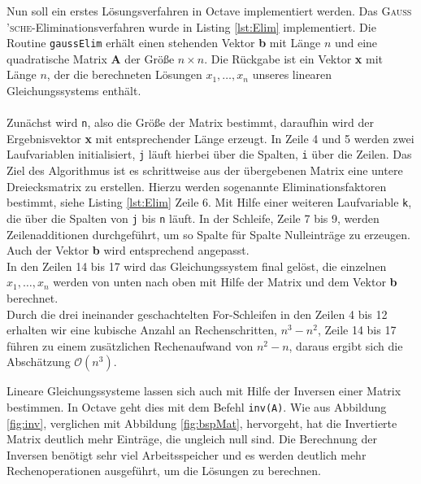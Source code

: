 Nun soll ein erstes Lösungsverfahren in Octave implementiert werden. Das \textsc{Gauss
'sche}-Eliminationsverfahren wurde in Listing \ref{lst:Elim} implementiert. Die Routine \texttt{gaussElim} erhält einen stehenden Vektor \textbf{b} mit Länge $n$ und eine quadratische Matrix \textbf{A} der Größe $n \times n$. Die Rückgabe ist ein Vektor \textbf{x} mit Länge $n$, der die berechneten Lösungen $x_{1}, \dots, x_{n}$ unseres linearen Gleichungssystems enthält.\\ \\
Zunächst wird \texttt{n}, also die Größe der Matrix bestimmt, daraufhin wird der Ergebnisvektor \textbf{x} mit entsprechender Länge erzeugt. In Zeile 4 und 5 werden zwei Laufvariablen initialisiert, \texttt{j} läuft hierbei über die Spalten, \texttt{i} über die Zeilen. Das Ziel des Algorithmus ist es schrittweise aus der übergebenen Matrix eine untere Dreiecksmatrix zu erstellen. Hierzu werden sogenannte Eliminationsfaktoren bestimmt, siehe Listing \ref{lst:Elim} Zeile 6. Mit Hilfe einer weiteren Laufvariable \texttt{k}, die über die Spalten von \texttt{j} bis \texttt{n} läuft. In der Schleife, Zeile 7 bis 9, werden Zeilenadditionen durchgeführt, um so Spalte für Spalte Nulleinträge zu erzeugen. Auch der Vektor \textbf{b} wird entsprechend angepasst. \\
In den Zeilen 14 bis 17 wird das Gleichungssystem final gelöst, die einzelnen $x_{1}, \dots, x_{n}$ werden von unten nach oben mit Hilfe der Matrix und dem Vektor \textbf{b} berechnet.  \\
Durch die drei ineinander geschachtelten For-Schleifen in den Zeilen 4 bis 12 erhalten wir eine kubische Anzahl an Rechenschritten, $n^{3}-n^{2}$, Zeile 14 bis 17 führen zu einem zusätzlichen Rechenaufwand von $n^{2}-n$, daraus ergibt sich die Abschätzung $\mathcal{O}(n^{3})$.
 
Lineare Gleichungssysteme lassen sich auch mit Hilfe der Inversen einer Matrix bestimmen. In Octave geht dies mit dem Befehl \texttt{inv(A)}. Wie aus Abbildung \ref{fig:inv}, verglichen mit Abbildung \ref{fig:bspMat}, hervorgeht, hat die Invertierte Matrix deutlich mehr Einträge, die ungleich null sind. Die Berechnung der Inversen benötigt sehr viel Arbeitsspeicher und es werden deutlich mehr Rechenoperationen ausgeführt, um die Lösungen zu berechnen.\\ \\

